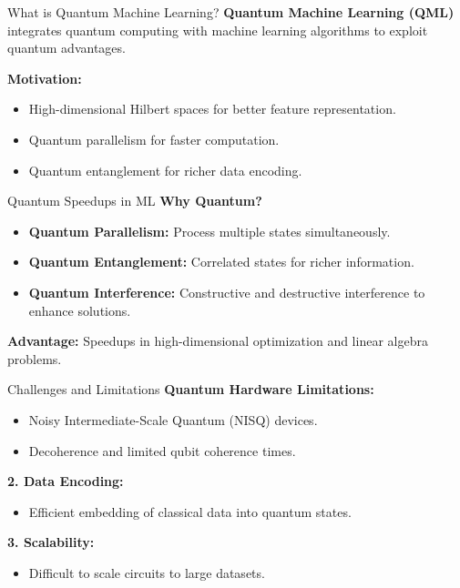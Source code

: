 \documentclass[aspectratio=169]{beamer}
\begin{document}
\begin{frame}{What is Quantum Machine Learning?}
\textbf{Quantum Machine Learning (QML)} integrates quantum computing with machine learning algorithms to exploit quantum advantages.

\vspace{10pt}
\textbf{Motivation:}
\begin{itemize}
    \item High-dimensional Hilbert spaces for better feature representation.
    \item Quantum parallelism for faster computation.
    \item Quantum entanglement for richer data encoding.
\end{itemize}


\end{frame}

\begin{frame}{Quantum Speedups in ML}
\textbf{Why Quantum?}
\begin{itemize}
    \item \textbf{Quantum Parallelism:} Process multiple states simultaneously.
    \item \textbf{Quantum Entanglement:} Correlated states for richer information.
    \item \textbf{Quantum Interference:} Constructive and destructive interference to enhance solutions.
\end{itemize}

\textbf{Advantage:}
Speedups in high-dimensional optimization and linear algebra problems.
\end{frame}


\begin{frame}{Challenges and Limitations}
\textbf{Quantum Hardware Limitations:}
\begin{itemize}
    \item Noisy Intermediate-Scale Quantum (NISQ) devices.
    \item Decoherence and limited qubit coherence times.
\end{itemize}

\textbf{2. Data Encoding:}
\begin{itemize}
    \item Efficient embedding of classical data into quantum states.
\end{itemize}

\textbf{3. Scalability:}
\begin{itemize}
    \item Difficult to scale circuits to large datasets.
\end{itemize}
\end{frame}
\end{document}
